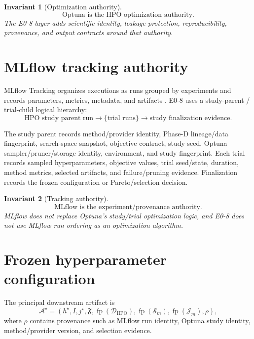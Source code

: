 \documentclass[11pt]{article}
\newcommand{\Data}{\mathcal{D}}
\newcommand{\Fingerprint}{\mathfrak{F}}
\newcommand{\Freeze}{\mathcal{A}^{\star}}
\newtheorem{invariant}{Invariant}
\begin{document}
\begin{invariant}[Optimization authority]
\[
\boxed{\text{Optuna is the HPO optimization authority.}}
\]
The E0-8 layer adds scientific identity, leakage protection, reproducibility,
provenance, and output contracts around that authority.
\end{invariant}

\section{MLflow tracking authority}

MLflow Tracking organizes executions as runs grouped by experiments and records
parameters, metrics, metadata, and artifacts \cite{MLflowDocs2026}. E0-8 uses a
study-parent / trial-child logical hierarchy:
\[
\boxed{
\text{HPO study parent run}
\rightarrow
\{\text{trial runs}\}
\rightarrow
\text{study finalization evidence}.
}
\]

The study parent records method/provider identity, Phase-D lineage/data
fingerprint, search-space snapshot, objective contract, study seed, Optuna
sampler/pruner/storage identity, environment, and study fingerprint. Each trial
records sampled hyperparameters, objective values, trial seed/state, duration,
method metrics, selected artifacts, and failure/pruning evidence. Finalization
records the frozen configuration or Pareto/selection decision.

\begin{invariant}[Tracking authority]
\[
\boxed{\text{MLflow is the experiment/provenance authority.}}
\]
MLflow does not replace Optuna's study/trial optimization logic, and E0-8 does
not use MLflow run ordering as an optimization algorithm.
\end{invariant}

\section{Frozen hyperparameter configuration}

The principal downstream artifact is
\[
\boxed{
\Freeze=
(h^{\star},I,j^{\star},\Fingerprint,\operatorname{fp}(\Data_{\mathrm{HPO}}),
\operatorname{fp}(\mathcal S_m),\operatorname{fp}(\mathcal J_m),\rho),
}
\]
where $\rho$ contains provenance such as MLflow run identity, Optuna study
identity, method/provider version, and selection evidence.
\end{document}
